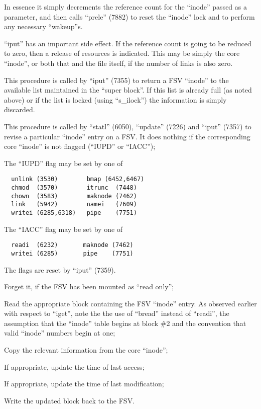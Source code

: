 In essence  it  simply  decrements  the
reference  count for the ``inode'' passed
as a parameter, and then calls  ``prele''
(7882) to reset the ``inode'' lock and to
perform any necessary ``wakeup''s.


``iput'' has an important side effect. If
the  reference  count  is  going  to be
reduced to  zero,  then  a  release  of
resources  is  indicated.  This  may be
simply the core ``inode'', or  both  that
and  the  file itself, if the number of
links is also zero.





This  procedure  is  called  by  ``iput''
(7355)  to  return a FSV ``inode'' to the
available list maintained in the ``super
block''.  If  this  list is already full
(as noted above)  or  if  the  list  is
locked  (using  ``s\_ilock'') the information is simply discarded.



This procedure  is  called  by ``statl''
(6050),   ``update''  (7226)  and  ``iput''
(7357) to revise a  particular  ``inode''
entry  on a FSV. It does nothing if the
corresponding  core  ``inode''   is   not
flagged (``IUPD'' or ``IACC'');


The ``IUPD'' flag may be set by one of

\begin{verbatim}
  unlink (3530)        bmap (6452,6467)
  chmod  (3570)        itrunc  (7448)
  chown  (3583)        maknode (7462)
  link   (5942)        namei   (7609)
  writei (6285,6318)   pipe    (7751)
\end{verbatim}

\noindent The ``IACC'' flag may be set by one of

\begin{verbatim}
  readi  (6232)       maknode (7462)
  writei (6285)       pipe    (7751)
\end{verbatim}


The flags are reset by ``iput'' (7359).

\bd
\item[7383:] Forget it, if the  FSV  has  been
mounted as ``read only'';


\item[7386:] Read the appropriate  block  containing  the  FSV  ``inode'' entry.
      As observed earlier with  respect
      to  ``iget'',  note  the the use of
      ``bread'' instead of  ``readi'',  the
      assumption that the ``inode'' table
      begins at block \#2 and  the  convention    that   valid   ``inode''
      numbers begin at one;


\item[7389:] Copy  the  relevant   information
      from the core ``inode'';


\item[7391:] If appropriate, update  the  time
      of last access;


\item[7396:] If appropriate, update  the  time
      of last modification;


\item[7400:] Write the updated block  back  to
      the FSV.
\ed
